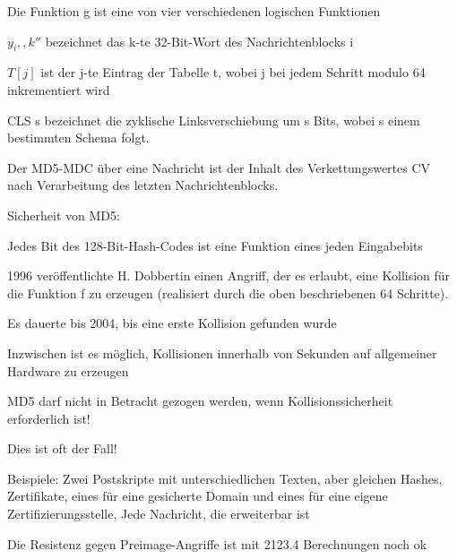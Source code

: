 \documentclass[a4paper]{article}
\begin{document}
\begin{multicols}{3}
\begin{itemize*}
\begin{itemize*}
\begin{itemize*}
                  \end{itemize*}
            \end{itemize*}
            \begin{itemize*}
                  \item Die Funktion g ist eine von vier verschiedenen logischen Funktionen
                  \item $y_i,,k''$ bezeichnet das k-te 32-Bit-Wort des Nachrichtenblocks i
                  \item $T[j]$ ist der j-te Eintrag der Tabelle t, wobei j bei jedem Schritt modulo 64 inkrementiert wird
                  \item CLS s bezeichnet die zyklische Linksverschiebung um s Bits, wobei s einem bestimmten Schema folgt.
            \end{itemize*}
            \item Der MD5-MDC über eine Nachricht ist der Inhalt des Verkettungswertes CV nach Verarbeitung des letzten Nachrichtenblocks.
            \item Sicherheit von MD5:
            \begin{itemize*}
                  \item Jedes Bit des 128-Bit-Hash-Codes ist eine Funktion eines jeden Eingabebits
                  \item 1996 veröffentlichte H. Dobbertin einen Angriff, der es erlaubt, eine Kollision für die Funktion f zu erzeugen (realisiert durch die oben beschriebenen 64 Schritte).
                  \item Es dauerte bis 2004, bis eine erste Kollision gefunden wurde
                  \item Inzwischen ist es möglich, Kollisionen innerhalb von Sekunden auf allgemeiner Hardware zu erzeugen
                  \item MD5 darf nicht in Betracht gezogen werden, wenn Kollisionssicherheit erforderlich ist!
                  \begin{itemize*}
                        \item Dies ist oft der Fall!
                        \item Beispiele: Zwei Postskripte mit unterschiedlichen Texten, aber gleichen Hashes, Zertifikate, eines für eine gesicherte Domain und eines für eine eigene Zertifizierungsstelle, Jede Nachricht, die erweiterbar ist
                  \end{itemize*}
                  \item Die Resistenz gegen Preimage-Angriffe ist mit 2123.4 Berechnungen noch ok
            \end{itemize*}
      \end{itemize*}


\end{multicols}
\end{document}
